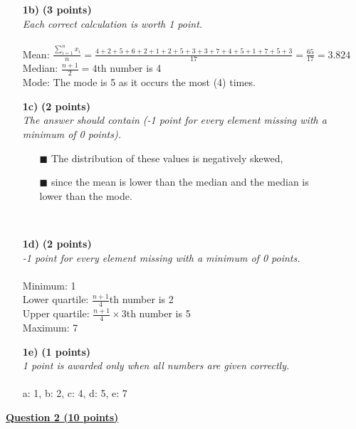 \begin{itemize}
     \item[\textbf{1b)}] \textbf{(3 points)} \\
     \textit{Each correct calculation is worth 1 point.}   \\
     \\
     Mean: $\frac{\sum_{i = 1}^n x_i}{n} = \frac{4 + 2 + 5 + 6 + 2 + 1 + 2 + 5 + 3 + 3 + 7 + 4 + 5 + 1 + 7 + 5 + 3}{17} = \frac{65}{17} = 3.824$\\
     Median: $\frac{n + 1}{2} = 4$th number is 4\\
     Mode: The mode is 5 as it occurs the most (4) times. \\
     \item[\textbf{1c)}] \textbf{(2 points)} \\
     \textit{The answer should contain (-1 point for every element missing with a minimum of 0 points).}
    \begin{itemize}
    \item[$\blacksquare$] The distribution of these values is negatively skewed,    
    \item[$\blacksquare$] since the mean is lower than the median and the median is \\lower than the mode.
    \end{itemize} \\
     \item[\textbf{1d)}] \textbf{(2 points)} \\
     \textit{-1 point for every element missing with a minimum of 0 points.}\\
     \\
     Minimum: 1 \\
     Lower quartile: $\frac{n + 1}{4}$th number is 2\\
     Upper quartile: $\frac{n + 1}{4} \times 3$th number is 5\\
     Maximum: 7 \\
\item[\textbf{1e)}] \textbf{(1 points)} \\
     \textit{1 point is awarded only when all numbers are given correctly.} \\ \\
     a: 1, b: 2, c: 4, d: 5, e: 7 \\
\end{itemize}

\underline{\textbf{Question 2 (10 points)}} \\

